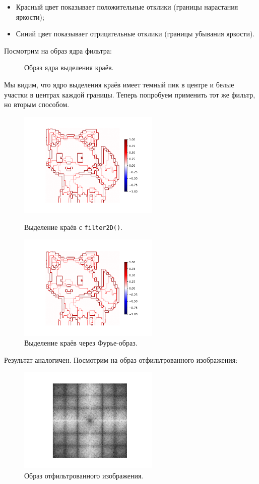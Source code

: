 \documentclass[a4paper]{article}
\begin{document}
\begin{itemize}
  \item Красный цвет показывает положительные отклики (границы нарастания яркости);
  \item Синий цвет показывает отрицательные отклики (границы убывания яркости).
\end{itemize}

Посмотрим на образ ядра фильтра:
\begin{figure}[H]
  \centering
  
  \caption{Образ ядра выделения краёв.}
\end{figure}
\noindent Мы видим, что ядро выделения краёв имеет темный пик в центре и белые участки в центрах каждой границы.
Теперь попробуем применить тот же фильтр, но вторым способом.
\begin{figure}[H]
  \centering
  \includegraphics[width=0.6\textwidth]{src/edge.png}
  \caption{Выделение краёв с \texttt{filter2D()}.}
  \includegraphics[width=0.6\textwidth]{src/ifft_edge.png}
  \caption{Выделение краёв через Фурье-образ.}
\end{figure}
\noindent Результат аналогичен. Посмотрим на образ отфильтрованного изображения:
\begin{figure}[H]
  \centering
  \includegraphics[width=0.6\textwidth]{src/ifft_spec_edge.png}
  \caption{Образ отфильтрованного изображения.}
\end{figure}
\end{document}
